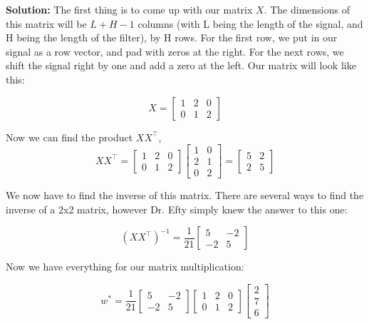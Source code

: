 \documentclass{article}
\begin{document}
\begin{enumerate}
    \textbf{Solution:} The first thing is to come up with our matrix $X$. The dimensions of this matrix will be $L + H - 1$ columns (with L being the length of the signal, and H being the length of the filter), by H rows. For the first row, we put in our signal as a row vector, and pad with zeros at the right. For the next rows, we shift the signal right by one and add a zero at the left. Our matrix will look like this:

    $$ X = 
    \begin{bmatrix}
        1 & 2 & 0 \\
        0 & 1 & 2
    \end{bmatrix}
    $$

    Now we can find the product $XX^\top$, 
    $$ XX^\top = 
    \begin{bmatrix}
        1 & 2 & 0 \\
        0 & 1 & 2
    \end{bmatrix}
    \begin{bmatrix}
        1 & 0 \\
        2 & 1 \\
        0 & 2 
    \end{bmatrix}
    = 
    \begin{bmatrix}
        5 & 2 \\
        2 & 5 
    \end{bmatrix}
    $$

    We now have to find the inverse of this matrix. There are several ways to find the inverse of a 2x2 matrix, however Dr. Efty simply knew the answer to this one: 

    $$ (XX^\top)^{-1} = 
    \frac{1}{21}
    \begin{bmatrix}
        5 & -2 \\
        -2 & 5 
    \end{bmatrix}
    $$

    Now we have everything for our matrix multiplication: 

    $$ w^* = 
    \frac{1}{21}
    \begin{bmatrix}
        5 & -2 \\
        -2 & 5 
    \end{bmatrix}
    \begin{bmatrix}
        1 & 2 & 0 \\
        0 & 1 & 2
    \end{bmatrix}
    \begin{bmatrix}
        2 \\
        7 \\
        6  
    \end{bmatrix}
    $$


\end{enumerate}
\end{document}
